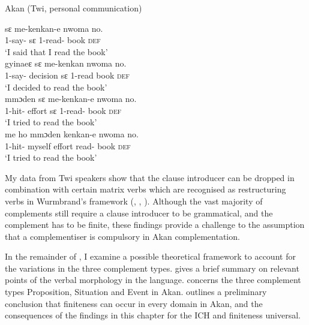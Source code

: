 \documentclass[output=paper]{langscibook}
\begin{document}
\begin{exe}
\ex \label{Paj3} Akan (Twi, personal communication)

\begin{xlist}

\ex \label{Paj3a}
 {s{ɛ}} {me-kenkan-e} {nwoma} {no.}\\
    1{\sg}-say-{\compl} s{ɛ} 1{\sg}-read-{\compl} book \textsc{def} \\
\glt `I said that I read the book’\\

\ex \label{Paj3b}
 {gyinae{ɛ}} {s{ɛ}} {me-kenkan} {nwoma} {no.}\\
     1{\sg}-say-{\compl} decision s{ɛ} 1{\sg}-read book \textsc{def}\\
\glt `I decided to read the book’\\

\ex \label{Paj3c}
 {mm{ɔ}den} {s{ɛ}} {me-kenkan-e} {nwoma} {no.}\\
     1{\sg}-hit-{\compl} effort s{ɛ} 1{\sg}-read-{\compl} book \textsc{def}\\
\glt `I tried to read the book’\\

\ex \label{Paj3d}
 {me ho} {mm{ɔ}den} {kenkan-e} {nwoma} {no.}\\
     1{\sg}-hit-{\compl} myself effort read-{\compl} book \textsc{def}\\
\glt `I tried to read the book’\\

\end{xlist}
\end{exe}
 

My data from Twi speakers show that the clause introducer can be dropped in combination with certain matrix verbs which are recognised as restructuring verbs in Wurmbrand’s framework (\citeyear{wurmbrand2001}, \citeyear{todorovic2015}, \citeyear{wurmbrandetal2020}). Although the vast majority of complements still require a clause introducer to be grammatical, and the complement has to be finite, these findings provide a challenge to the assumption that a complementiser is compulsory in Akan complementation. 

In the remainder of , I examine a possible theoretical framework to account for the variations in the three complement types.  gives a brief summary on relevant points of the verbal morphology in the language.  concerns the three complement types Proposition, Situation and Event in Akan.  outlines a preliminary conclusion that finiteness can occur in every domain in Akan, and the consequences of the findings in this chapter for the ICH and finiteness universal. 
\end{document}
